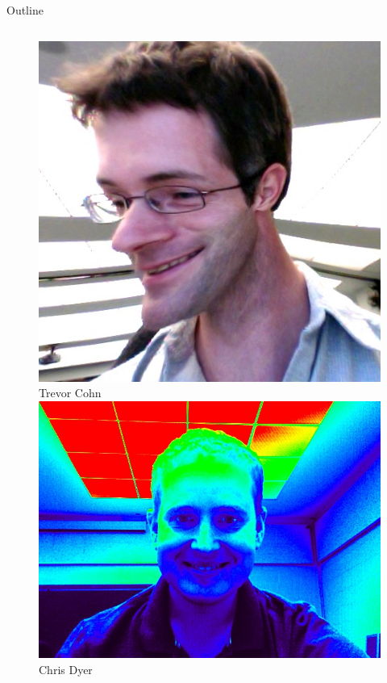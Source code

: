 \documentclass{beamer}
\begin{document}
\begin{frame}[t]{Outline}
\begin{columns}
  \begin{column}{0.2\textwidth}
    \begin{exampleblock}{}
      \begin{figure}
        \tiny
        {\centering \includegraphics[scale=0.07]{trevor.jpg}} \\
        Trevor Cohn \\
        
        {\centering \includegraphics[scale=0.06]{dyer.jpg}} \\
        Chris Dyer\\
        

\end{figure}
\end{exampleblock}
\end{column}
\end{columns}
\end{frame}
\end{document}

